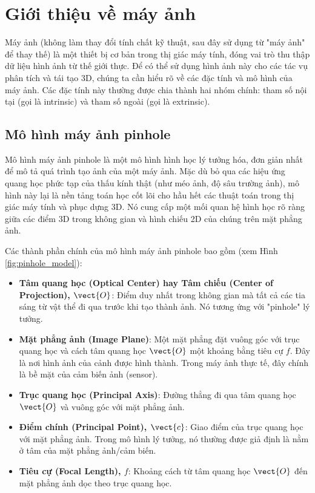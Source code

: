 \section{Giới thiệu về máy ảnh}

Máy ảnh (không làm thay đổi tính chất kỹ thuật, sau đây sử dụng từ "máy ảnh" để thay thế) là một thiết bị cơ bản trong thị giác máy tính, đóng vai trò thu thập dữ liệu hình ảnh từ thế giới thực. Để có thể sử dụng hình ảnh này cho các tác vụ phân tích và tái tạo 3D, chúng ta cần hiểu rõ về các đặc tính và mô hình của máy ảnh. Các đặc tính này thường được chia thành hai nhóm chính: tham số nội tại (gọi là  intrinsic) và tham số ngoài (gọi là extrinsic).

\subsection{Mô hình máy ảnh pinhole}
\label{subsec:pinhole_máy ảnh}

Mô hình máy ảnh pinhole là một mô hình hình học lý tưởng hóa, đơn giản nhất để mô tả quá trình tạo ảnh của một máy ảnh. Mặc dù bỏ qua các hiệu ứng quang học phức tạp của thấu kính thật (như méo ảnh, độ sâu trường ảnh), mô hình này lại là nền tảng toán học cốt lõi cho hầu hết các thuật toán trong thị giác máy tính và phục dựng 3D. Nó cung cấp một mối quan hệ hình học rõ ràng giữa các điểm 3D trong không gian và hình chiếu 2D của chúng trên mặt phẳng ảnh.

Các thành phần chính của mô hình máy ảnh pinhole bao gồm (xem Hình \ref{fig:pinhole_model}):
\begin{itemize}
    \item \textbf{Tâm quang học (Optical Center) hay Tâm chiếu (Center of Projection), $\vect{O}$}: Điểm duy nhất trong không gian mà tất cả các tia sáng từ vật thể đi qua trước khi tạo thành ảnh. Nó tương ứng với "pinhole" lý tưởng.
    \item \textbf{Mặt phẳng ảnh (Image Plane)}: Một mặt phẳng đặt vuông góc với trục quang học và cách tâm quang học $\vect{O}$ một khoảng bằng tiêu cự $f$. Đây là nơi hình ảnh của cảnh được hình thành. Trong máy ảnh thực tế, đây chính là bề mặt của cảm biến ảnh (sensor).
    \item \textbf{Trục quang học (Principal Axis)}: Đường thẳng đi qua tâm quang học $\vect{O}$ và vuông góc với mặt phẳng ảnh.
    \item \textbf{Điểm chính (Principal Point), $\vect{c}$}: Giao điểm của trục quang học với mặt phẳng ảnh. Trong mô hình lý tưởng, nó thường được giả định là nằm ở tâm của mặt phẳng ảnh/cảm biến.
    \item \textbf{Tiêu cự (Focal Length), $f$}: Khoảng cách từ tâm quang học $\vect{O}$ đến mặt phẳng ảnh dọc theo trục quang học.
\end{itemize}

